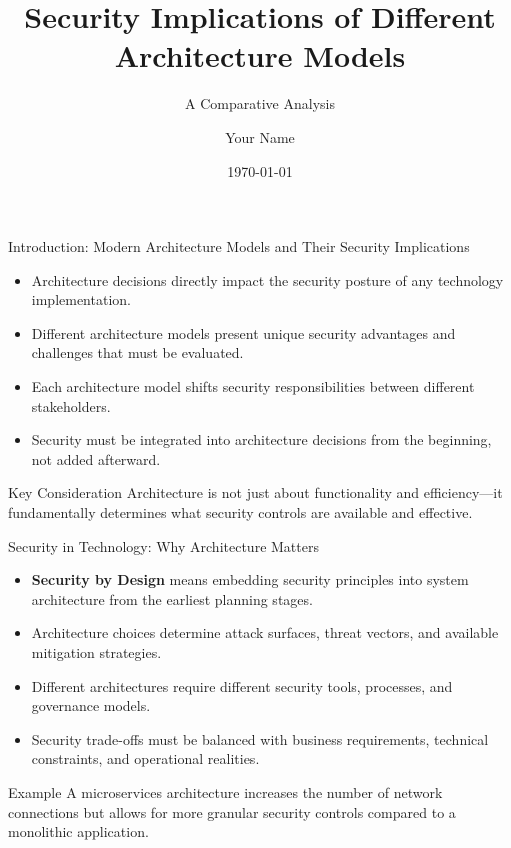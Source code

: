 \documentclass{beamer}
\title{Security Implications of Different Architecture Models}
\subtitle{A Comparative Analysis}
\author{Your Name}
\institute{Your Institution}
\date{\today}
\begin{document}
\begin{frame}
\titlepage
\end{frame}

\begin{frame}{Introduction: Modern Architecture Models and Their Security Implications}
\begin{itemize}
\item Architecture decisions directly impact the security posture of any technology implementation.
\item Different architecture models present unique security advantages and challenges that must be evaluated.
\item Each architecture model shifts security responsibilities between different stakeholders.
\item Security must be integrated into architecture decisions from the beginning, not added afterward.
\end{itemize}

\begin{alertblock}{Key Consideration}
Architecture is not just about functionality and efficiency—it fundamentally determines what security controls are available and effective.
\end{alertblock}
\end{frame}

\begin{frame}{Security in Technology: Why Architecture Matters}
\begin{itemize}
\item \textbf{Security by Design} means embedding security principles into system architecture from the earliest planning stages.
\item Architecture choices determine attack surfaces, threat vectors, and available mitigation strategies.
\item Different architectures require different security tools, processes, and governance models.
\item Security trade-offs must be balanced with business requirements, technical constraints, and operational realities.
\end{itemize}

\begin{exampleblock}{Example}
A microservices architecture increases the number of network connections but allows for more granular security controls compared to a monolithic application.
\end{exampleblock}
\end{frame}
\end{document}
